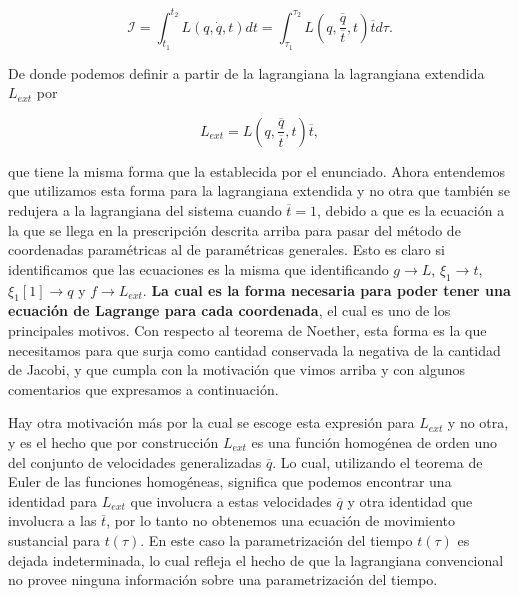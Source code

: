 \documentclass[a4paper,10pt]{article}
\numberwithin{equation}{section}
\begin{document}
\begin{equation}
 \mathcal{I} = \int_{t_1}^{t_2} L(q,\dot{q},t)dt = 
 \int_{\tau_1}^{\tau_2} L\left(q,\frac{\overline{q}}{\overline{t}},t\right)\overline{t}d\tau.
\end{equation}

De donde podemos definir a partir de la lagrangiana  
la lagrangiana extendida $L_{ext}$ por 

\begin{equation}
 L_{ext} = L(q,\frac{\overline{q}}{\overline{t}},t)\overline{t},
 \label{eq:6lagrangianaExt}
\end{equation}

que tiene la misma forma que la establecida por el enunciado. Ahora entendemos que 
utilizamos esta forma para la lagrangiana extendida y no otra que también se redujera
a la lagrangiana del sistema cuando $\overline{t} = 1$, debido  a que 
es la ecuación a la que se llega en la prescripción descrita arriba para pasar del método 
de coordenadas paramétricas al de paramétricas generales. Esto es claro si identificamos 
que las ecuaciones  es la misma que  
identificando $g\rightarrow L$, $\xi_1 \rightarrow t$, $\xi_1{[1]} \rightarrow q$ y 
$f \rightarrow L_{ext}$. \textbf{La cual es la forma necesaria para poder tener una ecuación 
de Lagrange para cada coordenada}, el cual es uno de los principales motivos. Con respecto 
al teorema de Noether, esta forma es la que necesitamos para que surja como cantidad 
conservada la negativa de la cantidad de Jacobi, y que cumpla con la motivación que 
vimos arriba y con algunos comentarios que expresamos a continuación.

\vspace{.3cm}

Hay otra motivación más por la cual se escoge esta expresión para $L_{ext}$ y no otra,
y es el hecho que por construcción $L_{ext}$ es una función homogénea de orden uno 
del conjunto de velocidades generalizadas $\overline{q}$. Lo cual, utilizando 
el teorema de Euler de las funciones homogéneas, significa que podemos encontrar 
una identidad para $L_{ext}$ que involucra a estas velocidades $\overline{q}$ y otra
identidad que involucra a las $\overline{t}$, por lo tanto no obtenemos una ecuación 
de movimiento sustancial para $t(\tau)$. En este caso la parametrización del 
tiempo $t(\tau)$ es dejada indeterminada, lo cual refleja el hecho de que la lagrangiana 
convencional no provee ninguna información sobre una parametrización del tiempo.
\end{document}
